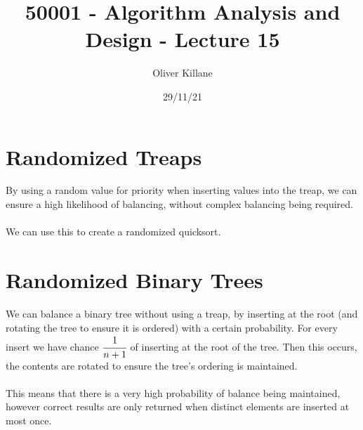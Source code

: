\documentclass{report}
\title{50001 - Algorithm Analysis and Design - Lecture 15}
\author{Oliver Killane}
\date{29/11/21}
\begin{document}
    \maketitle

    \section*{Randomized Treaps}
        By using a random value for priority when inserting values into the treap, we can ensure a high likelihood of balancing, without complex balancing being required.
        \\
        \\ We can use this to create a randomized quicksort.
    
    \section*{Randomized Binary Trees}
        We can balance a binary tree without using a treap, by inserting at the root (and rotating the tree to ensure it is ordered) with a certain probability.
        For every insert we have chance $\cfrac{1}{n+1}$ of inserting at the root of the tree. Then this occurs, the contents are rotated to ensure the tree's ordering is maintained.
        \\
        \\ This means that there is a very high probability of balance being maintained, however correct results are only returned when distinct elements are inserted at most once.
\end{document}
